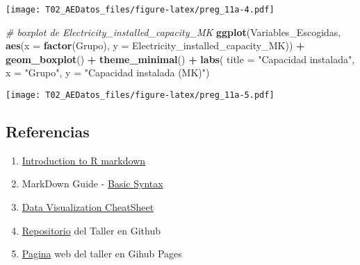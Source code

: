 \documentclass[
]{article}
\newenvironment{Shaded}{\begin{snugshade}}{\end{snugshade}}
\newcommand{\AttributeTok}[1]{\textcolor[rgb]{0.13,0.29,0.53}{#1}}
\newcommand{\CommentTok}[1]{\textcolor[rgb]{0.56,0.35,0.01}{\textit{#1}}}
\newcommand{\FunctionTok}[1]{\textcolor[rgb]{0.13,0.29,0.53}{\textbf{#1}}}
\newcommand{\NormalTok}[1]{#1}
\newcommand{\SpecialCharTok}[1]{\textcolor[rgb]{0.81,0.36,0.00}{\textbf{#1}}}
\newcommand{\StringTok}[1]{\textcolor[rgb]{0.31,0.60,0.02}{#1}}
\providecommand{\tightlist}{%
  \setlength{\itemsep}{0pt}\setlength{\parskip}{0pt}}
\begin{document}
\texttt{[image: T02\_AEDatos\_files/figure-latex/preg\_11a-4.pdf]}

\begin{Shaded}
\begin{Highlighting}[]
\CommentTok{\# boxplot de Electricity\_installed\_capacity\_MK}
\FunctionTok{ggplot}\NormalTok{(Variables\_Escogidas, }\FunctionTok{aes}\NormalTok{(}\AttributeTok{x =} \FunctionTok{factor}\NormalTok{(Grupo), }\AttributeTok{y =}\NormalTok{ Electricity\_installed\_capacity\_MK)) }\SpecialCharTok{+}
  \FunctionTok{geom\_boxplot}\NormalTok{() }\SpecialCharTok{+}
  \FunctionTok{theme\_minimal}\NormalTok{() }\SpecialCharTok{+}
  \FunctionTok{labs}\NormalTok{(}
    \AttributeTok{title =} \StringTok{"Capacidad instalada"}\NormalTok{,}
    \AttributeTok{x =} \StringTok{"Grupo"}\NormalTok{,}
    \AttributeTok{y =} \StringTok{"Capacidad instalada (MK)"}\NormalTok{)}
\end{Highlighting}
\end{Shaded}

\texttt{[image: T02\_AEDatos\_files/figure-latex/preg\_11a-5.pdf]}

\subsection{Referencias}\label{referencias}

\begin{enumerate}
\def\labelenumi{\arabic{enumi}.}
\tightlist
\item
  \href{https://rmarkdown.rstudio.com/articles_intro.html}{Introduction
  to R markdown}
\item
  MarkDown Guide -
  \href{https://www.markdownguide.org/basic-syntax/}{Basic Syntax}
\item
  \href{https://github.com/rstudio/cheatsheets/blob/main/data-visualization.pdf}{Data
  Visualization CheatSheet}
\item
  \href{https://github.com/aosoriom7/MER_AED_2025I}{Repositorio} del
  Taller en Github
\item
  \href{https://aosoriom7.github.io/MER_AED_2025I/scripts/02.html}{Pagina}
  web del taller en Gihub Pages
\end{enumerate}
\end{document}
